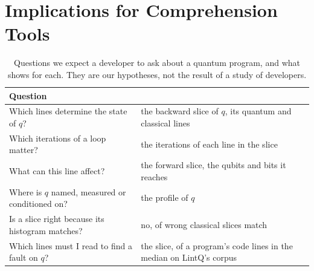 \section{Implications for Comprehension Tools}\label{sec:discussion}

\begin{table}[t]
  \centering
  \caption{Questions we expect a developer to ask about a quantum program, and what \tool{} shows for each.
  They are our hypotheses, not the result of a study of developers.}
  \label{tab:tasks}
  \footnotesize\setlength{\tabcolsep}{3pt}
  \begin{tabular}{@{}p{} p{}@{}}
    \toprule
    Question & \tool{} \\
    \midrule
    Which lines determine the state of $q$? & the backward slice of $q$, its quantum and classical lines \\
    Which iterations of a loop matter? & the iterations of each line in the slice \\
    What can this line affect? & the forward slice, the qubits and bits it reaches \\
    Where is $q$ named, measured or conditioned on? & the profile of $q$ \\
    Is a slice right because its histogram matches? & no, \numFdCpdgZMatchPct{} of wrong classical slices match \\
    Which lines must I read to find a fault on $q$? & the slice, \numScaleReadMedianPct{} of a program's code
    lines in the median on LintQ's corpus \\
    \bottomrule
  \end{tabular}
\end{table}

